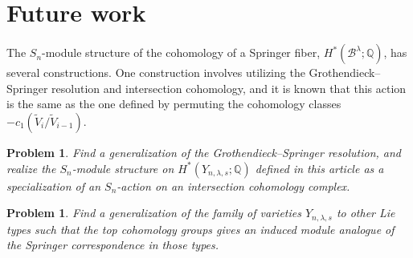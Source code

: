 \documentclass[submission]{FPSAC2021}
\theoremstyle{plain}
\newtheorem{problem}[theorem]{Problem}
\numberwithin{equation}{section}
\newcommand{\bQ}{\mathbb{Q}}
\newcommand{\cB}{\mathcal{B}}
\begin{document}
\section{Future work}\label{sec:FutureWork}

The $S_n$-module structure of the cohomology of a Springer fiber, $H^*(\cB^\lambda;\bQ)$, has several constructions. One construction involves utilizing the Grothendieck--Springer resolution and intersection cohomology, and it is known that this action is the same as the one defined by permuting the cohomology classes $-c_1(\widetilde V_i/\widetilde V_{i-1})$.

\begin{problem}
Find a generalization of the Grothendieck--Springer resolution, and realize the $S_n$-module structure on $H^*(Y_{n,\lambda,s};\bQ)$ defined in this article as a specialization of an $S_n$-action on an intersection cohomology complex.
\end{problem}


\begin{problem}
Find a generalization of the family of varieties $Y_{n,\lambda,s}$ to other Lie types such that the top cohomology groups gives an induced module analogue of the Springer correspondence in those types.
\end{problem}







\printbibliography
\end{document}
